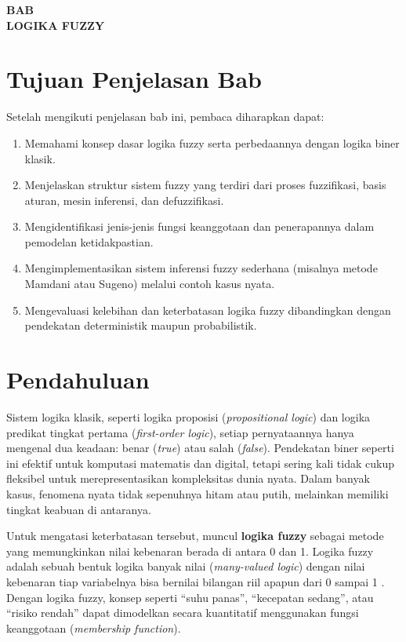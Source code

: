 \documentclass[12pt,a4paper]{article}
\theoremstyle{remark}
\begin{document}
\begin{center}
    \Large \textbf{BAB}\\[1em]
    \large \textbf{LOGIKA FUZZY}\\[2em]
\end{center}

\section{Tujuan Penjelasan Bab}
Setelah mengikuti penjelasan bab ini, pembaca diharapkan dapat:
\begin{enumerate}
    \item Memahami konsep dasar logika fuzzy serta perbedaannya dengan logika biner klasik.
    \item Menjelaskan struktur sistem fuzzy yang terdiri dari proses fuzzifikasi, basis aturan, mesin inferensi, dan defuzzifikasi.
    \item Mengidentifikasi jenis-jenis fungsi keanggotaan dan penerapannya dalam pemodelan ketidakpastian.
    \item Mengimplementasikan sistem inferensi fuzzy sederhana (misalnya metode Mamdani atau Sugeno) melalui contoh kasus nyata.
    \item Mengevaluasi kelebihan dan keterbatasan logika fuzzy dibandingkan dengan pendekatan deterministik maupun probabilistik.
\end{enumerate}


\section{Pendahuluan}

Sistem logika klasik, seperti logika proposisi (\textit{propositional logic}) dan logika predikat tingkat pertama (\textit{first-order logic}), setiap pernyataannya hanya mengenal dua keadaan: benar (\textit{true}) atau salah (\textit{false}). Pendekatan biner seperti ini efektif untuk komputasi matematis dan digital,
tetapi sering kali tidak cukup fleksibel untuk merepresentasikan kompleksitas dunia nyata.
Dalam banyak kasus, fenomena nyata tidak sepenuhnya hitam atau putih,
melainkan memiliki tingkat keabuan di antaranya.

Untuk mengatasi keterbatasan tersebut, muncul \textbf{logika fuzzy}
sebagai metode yang memungkinkan nilai kebenaran berada di antara 0 dan 1. Logika fuzzy adalah sebuah bentuk logika banyak nilai (\textit{many-valued logic}) dengan nilai kebenaran tiap variabelnya bisa bernilai bilangan riil apapun dari 0 sampai 1 \cite{novak_mathematical_1999}.
Dengan logika fuzzy, konsep seperti “suhu panas”, “kecepatan sedang”,
atau “risiko rendah” dapat dimodelkan secara kuantitatif menggunakan
fungsi keanggotaan (\textit{membership function}).
\end{document}
